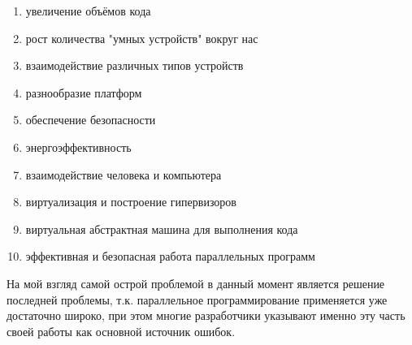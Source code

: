 \documentclass[a4paper, 12pt]{article} %
\begin{document}
\begin{enumerate}
\item  увеличение объёмов кода
\item  рост количества "умных устройств" вокруг нас
\item  взаимодействие различных типов устройств
\item  разнообразие платформ
\item  обеспечение безопасности
\item  энергоэффективность
\item  взаимодействие человека и компьютера
\item  виртуализация и построение гипервизоров
\item  виртуальная абстрактная машина для выполнения кода
\item  эффективная и безопасная работа параллельных программ
\end{enumerate}

На мой взгляд самой острой проблемой в данный момент является решение последней проблемы, т.к. параллельное программирование применяется уже достаточно широко, при этом многие разработчики указывают именно эту часть своей работы как основной источник ошибок.


%

%


\end{document}
